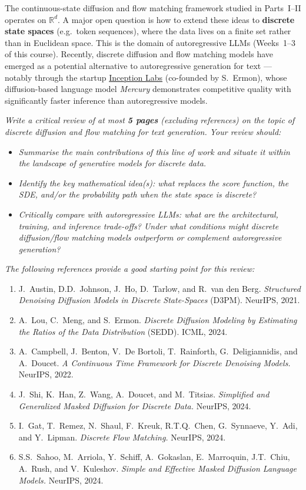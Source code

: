 \documentclass[11pt]{article}
\theoremstyle{definition}
\theoremstyle{remark}
\newcommand{\R}{\mathbb{R}}
\begin{document}
The continuous-state diffusion and flow matching framework studied in Parts~I--II operates on $\R^d$. A major open question is how to extend these ideas to \textbf{discrete state spaces} (e.g.\ token sequences), where the data lives on a finite set rather than in Euclidean space. This is the domain of autoregressive LLMs (Weeks~1--3 of this course). Recently, discrete diffusion and flow matching models have emerged as a potential alternative to autoregressive generation for text --- notably through the startup \href{https://www.inceptionlabs.ai/}{Inception Labs} (co-founded by S.\ Ermon), whose diffusion-based language model \textit{Mercury} demonstrates competitive quality with significantly faster inference than autoregressive models.

\medskip

\textit{Write a critical review of at most \textbf{5 pages} (excluding references) on the topic of discrete diffusion and flow matching for text generation. Your review should:}
\begin{itemize}
\item \textit{Summarise the main contributions of this line of work and situate it within the landscape of generative models for discrete data.}
\item \textit{Identify the key mathematical idea(s): what replaces the score function, the SDE, and/or the probability path when the state space is discrete?}
\item \textit{Critically compare with autoregressive LLMs: what are the architectural, training, and inference trade-offs? Under what conditions might discrete diffusion/flow matching models outperform or complement autoregressive generation?}
\end{itemize}

\medskip

\textit{The following references provide a good starting point for this review:}

\begin{enumerate}
\item J.\ Austin, D.D.\ Johnson, J.\ Ho, D.\ Tarlow, and R.\ van den Berg. \textit{Structured Denoising Diffusion Models in Discrete State-Spaces} (D3PM). NeurIPS, 2021.
\item A.\ Lou, C.\ Meng, and S.\ Ermon. \textit{Discrete Diffusion Modeling by Estimating the Ratios of the Data Distribution} (SEDD). ICML, 2024.
\item A.\ Campbell, J.\ Benton, V.\ De Bortoli, T.\ Rainforth, G.\ Deligiannidis, and A.\ Doucet. \textit{A Continuous Time Framework for Discrete Denoising Models.} NeurIPS, 2022.
\item J.\ Shi, K.\ Han, Z.\ Wang, A.\ Doucet, and M.\ Titsias. \textit{Simplified and Generalized Masked Diffusion for Discrete Data.} NeurIPS, 2024.
\item I.\ Gat, T.\ Remez, N.\ Shaul, F.\ Kreuk, R.T.Q.\ Chen, G.\ Synnaeve, Y.\ Adi, and Y.\ Lipman. \textit{Discrete Flow Matching.} NeurIPS, 2024.
\item S.S.\ Sahoo, M.\ Arriola, Y.\ Schiff, A.\ Gokaslan, E.\ Marroquin, J.T.\ Chiu, A.\ Rush, and V.\ Kuleshov. \textit{Simple and Effective Masked Diffusion Language Models.} NeurIPS, 2024.
\end{enumerate}
\end{document}
